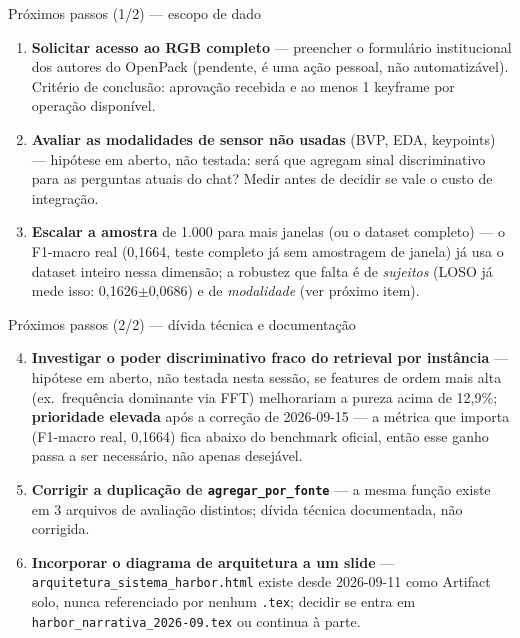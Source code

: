 \documentclass{beamer}
\begin{document}
\begin{frame}{Próximos passos (1/2) — escopo de dado}
  \small
  \begin{enumerate}
    \item \textbf{Solicitar acesso ao RGB completo} — preencher o formulário institucional dos
      autores do OpenPack (pendente, é uma ação pessoal, não automatizável). Critério de
      conclusão: aprovação recebida e ao menos 1 keyframe por operação disponível.
    \item \textbf{Avaliar as modalidades de sensor não usadas} (BVP, EDA, keypoints) — hipótese
      em aberto, não testada: será que agregam sinal discriminativo para as perguntas atuais
      do chat? Medir antes de decidir se vale o custo de integração.
    \item \textbf{Escalar a amostra} de 1.000 para mais janelas (ou o dataset completo) — o
      F1-macro real (0,1664, teste completo já sem amostragem de janela) já usa o dataset
      inteiro nessa dimensão; a robustez que falta é de \emph{sujeitos} (LOSO já mede isso:
      0,1626$\pm$0,0686) e de \emph{modalidade} (ver próximo item).
  \end{enumerate}
\end{frame}

\begin{frame}{Próximos passos (2/2) — dívida técnica e documentação}
  \small
  \begin{enumerate}
    \setcounter{enumi}{3}
    \item \textbf{Investigar o poder discriminativo fraco do retrieval por instância} — hipótese
      em aberto, não testada nesta sessão, se features de ordem mais alta (ex.\ frequência
      dominante via FFT) melhorariam a pureza acima de 12,9\%; \textbf{prioridade elevada} após
      a correção de 2026-09-15 — a métrica que importa (F1-macro real, 0,1664) fica abaixo do
      benchmark oficial, então esse ganho passa a ser necessário, não apenas desejável.
    \item \textbf{Corrigir a duplicação de \texttt{agregar\_por\_fonte}} — a mesma função existe
      em 3 arquivos de avaliação distintos; dívida técnica documentada, não corrigida.
    \item \textbf{Incorporar o diagrama de arquitetura a um slide} —
      \texttt{arquitetura\_sistema\_harbor.html} existe desde 2026-09-11 como Artifact solo,
      nunca referenciado por nenhum \texttt{.tex}; decidir se entra em
      \texttt{harbor\_narrativa\_2026-09.tex} ou continua à parte.
  \end{enumerate}
\end{frame}
\end{document}
